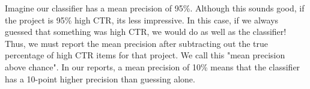Imagine our classifier has a mean precision of 95\%. Although this sounds good, if the project is 95\% high CTR, it\textsc{}s less impressive. In this case, if we always guessed that something was high CTR, we would do as well as the classifier! Thus, we must report the mean precision after subtracting out the true percentage of high CTR items for that project. We call this "mean precision above chance". In our reports, a mean precision of 10\% means that the classifier has a 10-point higher precision than guessing alone.



